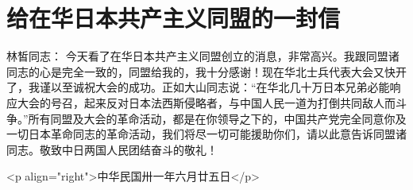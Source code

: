 \section[给在华日本共产主义同盟的一封信]{给在华日本共产主义同盟的一封信}


林皙同志：
今天看了在华日本共产主义同盟创立的消息，非常高兴。我跟同盟诸同志的心是完全一致的，同盟给我的，我十分感谢！现在华北士兵代表大会又快开了，我谨以至诚祝大会的成功。正如大山同志说：“在华北几十万日本兄弟必能响应大会的号召，起来反对日本法西斯侵略者，与中国人民一道为打倒共同敌人而斗争。”所有同盟及大会的革命活动，都是在你领导之下的，中国共产党完全同意你及一切日本革命同志的革命活动，我们将尽一切可能援助你们，请以此意告诉同盟诸同志。敬致中日两国人民团结奋斗的敬礼！

<p align="right">中华民国卅一年六月廿五日</p>

